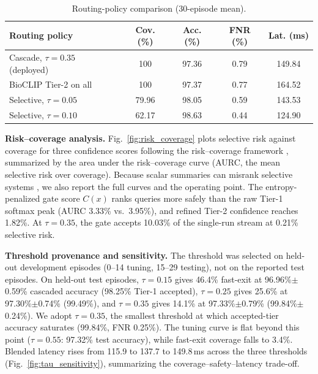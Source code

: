 \documentclass[preprint,12pt]{elsarticle}
\begin{document}
\begin{table}[htbp]
\caption{Routing-policy comparison (30-episode mean).}
\label{tab:gate_scenario}
\centering

\footnotesize
\setlength{\tabcolsep}{3pt}
\begin{tabular*}{\columnwidth}{@{\extracolsep{\fill}}lcccc}
\toprule
\textbf{Routing policy} & \textbf{Cov. (\%)} & \textbf{Acc. (\%)} & \textbf{FNR (\%)} & \textbf{Lat. (ms)} \\
\midrule
Cascade, $\tau=0.35$ (deployed) & 100 & 97.36 & 0.79 & 149.84 \\
BioCLIP Tier-2 on all & 100 & 97.37 & 0.77 & 164.52 \\
Selective, $\tau=0.05$ & 79.96 & 98.05 & 0.59 & 143.53 \\
Selective, $\tau=0.10$ & 62.17 & 98.63 & 0.44 & 124.90 \\
\bottomrule
\end{tabular*}
\end{table}

\textbf{Risk--coverage analysis.} Fig.~\ref{fig:risk_coverage} plots selective risk against coverage for three confidence scores following the risk--coverage framework \cite{geifman2017selective}, summarized by the area under the risk--coverage curve (AURC, the mean selective risk over coverage). Because scalar summaries can misrank selective systems \cite{traub2024overcoming}, we also report the full curves and the operating point. The entropy-penalized gate score $C(x)$ ranks queries more safely than the raw Tier-1 softmax peak (AURC 3.33\% vs.\ 3.95\%), and refined Tier-2 confidence reaches 1.82\%. At $\tau=0.35$, the gate accepts 10.03\% of the single-run stream at 0.21\% selective risk.

\textbf{Threshold provenance and sensitivity.} The threshold was selected on held-out development episodes (0--14 tuning, 15--29 testing), not on the reported test episodes. On held-out test episodes, $\tau=0.15$ gives 46.4\% fast-exit at 96.96\%$\pm$0.59\% cascaded accuracy (98.25\% Tier-1 accepted), $\tau=0.25$ gives 25.6\% at 97.30\%$\pm$0.74\% (99.49\%), and $\tau=0.35$ gives 14.1\% at 97.33\%$\pm$0.79\% (99.84\%$\pm$0.24\%). We adopt $\tau=0.35$, the smallest threshold at which accepted-tier accuracy saturates (99.84\%, FNR 0.25\%). The tuning curve is flat beyond this point ($\tau=0.55$: 97.32\% test accuracy), while fast-exit coverage falls to 3.4\%. Blended latency rises from 115.9 to 137.7 to 149.8\,ms across the three thresholds (Fig.~\ref{fig:tau_sensitivity}), summarizing the coverage--safety--latency trade-off.
\end{document}
